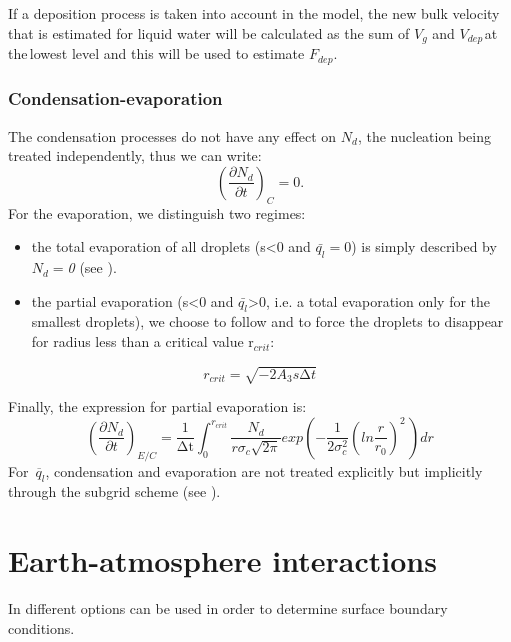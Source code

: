 If a deposition process is taken into account in the model, the new bulk
velocity that is estimated for liquid water will be calculated as the sum of
$V_{g}$ and $V_{dep\, }$at the$_{\, }$lowest level and this will be used to
estimate $F_{dep}$.

\subsubsection{Condensation-evaporation}
The condensation processes do not have any effect on $N_{d}$, the nucleation
being treated independently, thus we can write:
\begin{equation}
\left( \frac{\partial N_{d}}{\partial t} \right)_{C}=0.
\end{equation}
For the evaporation, we distinguish two regimes:
\begin{itemize}
\item the total evaporation of all droplets (s\textless 0 and
 $\bar{q_{l}}=$0) is simply described by $N_{d}=$\textit{0} (see \cite{Cohard:2000}).
\item the partial evaporation (s\textless 0 and
 $\bar{q_{l}}$\textgreater 0, i.e. a total evaporation only for the
 smallest droplets), we choose to follow \cite{Chaumerliac:1987} and to force
 the droplets to disappear for radius less than a critical value r$_{crit}$:
\end{itemize}
\begin{equation}
r_{crit}=\sqrt {-2A_{3}s\mathrm{\Delta }t}
\end{equation}

Finally, the expression for partial evaporation is:
\begin{equation}
\left( \frac{\partial N_{d}}{\partial t}
\right)_{E/C}=\frac{1}{\mathrm{\Delta t}}\int_{0}^{r_{crit}}
\frac{N_{d}}{r\sigma_{c}\sqrt {2\pi } } exp\left( -\frac{1}{2\sigma
_{c}^{2}}\left( ln\frac{r}{r_{0}} \right)^{2}\, \right)dr
\end{equation}
For $\overline{{\, q}_{l}}$, condensation and evaporation are not treated
explicitly but implicitly through the subgrid scheme (see \cite{Bouzereau:2007}).

\section{Earth-atmosphere interactions}
In \CS different options can be used in order to
determine surface boundary conditions.


